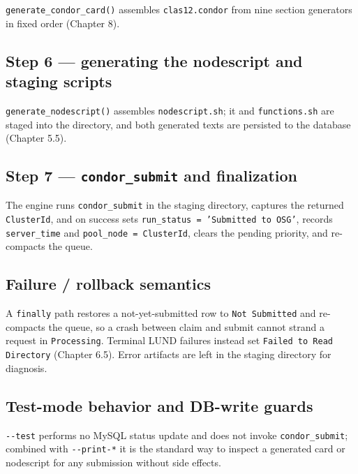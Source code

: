 \texttt{generate\_\allowbreak{}condor\_\allowbreak{}card()} assembles \texttt{clas12.\allowbreak{}condor} from
nine section generators in fixed order (Chapter 8).

\subsection{Step 6 --- generating the nodescript and staging scripts}

\texttt{generate\_\allowbreak{}nodescript()} assembles \texttt{nodescript.\allowbreak{}sh}; it and
\texttt{functions.\allowbreak{}sh} are staged into the directory, and both generated texts are persisted to the
database (Chapter 5.5).

\subsection{Step 7 --- \texttt{condor\_\allowbreak{}submit} and finalization}

The engine runs \texttt{condor\_\allowbreak{}submit} in the staging directory, captures the returned
\texttt{ClusterId}, and on success sets \texttt{run\_\allowbreak{}status =\allowbreak{} 'Submitted to OSG'},
records \texttt{server\_\allowbreak{}time} and \texttt{pool\_\allowbreak{}node =\allowbreak{} ClusterId},
clears the pending priority, and re-compacts the queue.

\subsection{Failure / rollback semantics}

A \texttt{finally} path restores a not-yet-submitted row to \texttt{Not Submitted} and re-compacts the queue,
so a crash between claim and submit cannot strand a request in \texttt{Processing}. Terminal LUND failures
instead set \texttt{Failed to Read Directory} (Chapter 6.5). Error artifacts are left in the staging directory
for diagnosis.

\subsection{Test-mode behavior and DB-write guards}

\texttt{-\allowbreak{}-\allowbreak{}test} performs no MySQL status update and does not invoke
\texttt{condor\_\allowbreak{}submit}; combined with \texttt{-\allowbreak{}-\allowbreak{}print-\allowbreak{}*}
it is the standard way to inspect a generated card or nodescript for any submission without side effects.
